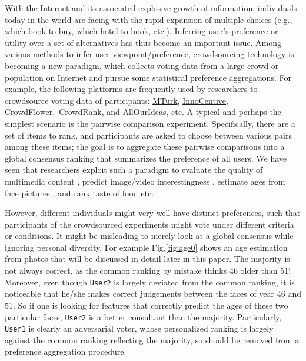 \documentclass[10pt,journal,cspaper,compsoc]{IEEEtran}
\begin{document}
With the Internet and its associated explosive growth of information, individuals today in the world are facing with the
rapid expansion of multiple choices (e.g., which book to buy, which hotel to book, etc.). Inferring user's preference or utility over a set of alternatives has thus become an important
issue. Among various methods to infer user viewpoint/preference, crowdsourcing technology is becoming a new paradigm, which collects voting data from a large crowd or population on Internet and pursue some statistical preference aggregations. For example, the following platforms are frequently used by researchers to crowdsource voting data of participants: \href{https://www.mturk.com}{MTurk}, \href{http://www.innocentive.com/}{InnoCentive}, \href{http://crowdflower.com/}{CrowdFlower},~\href{http://www.crowdrank.net/}{CrowdRank}, and \href{http://www.allourideas.org/}{AllOurIdeas}, etc. A typical and perhaps the simplest scenario is the pairwise comparison experiment. Specifically,
there are a set of items to rank, and participants are asked to choose between various pairs among these items; the goal is to aggregate these pairwise comparisons
into a global consensus ranking that summarizes the preference of all users. We have seen that researchers exploit such a paradigm to evaluate the quality of multimedia content \cite{MM09}, predict image/video interestingness \cite{fu2014interestingness}, estimate ages from face pictures \cite{fu2015robust}, and rank taste of food \cite{jamieson2011active} etc.


However, different individuals might very well have distinct preferences, such that participants of the crowdsourced experiments might vote under different criteria or conditions. It might be misleading to merely look at a global consensus while ignoring personal diversity. For example Fig.\ref{fig:age0} shows an age estimation from photos that will be discussed in detail later in this paper. The majority is not always correct, as the common ranking by mistake thinks 46 older than 51! Moreover, even though {\tt User2} is largely deviated from the common ranking, it is noticeable that he/she makes correct judgements between the faces of year 46 and 51. So if one is looking for features that correctly predict the ages of these two particular faces, {\tt User2} is a better consultant than the majority. Particularly, {\tt User1} is clearly an adversarial voter, whose personalized ranking is largely against the common ranking reflecting the majority, so should be removed from a preference aggregation procedure.
\end{document}
